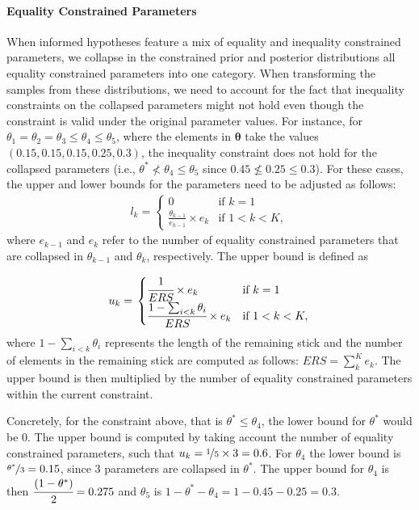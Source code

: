 \documentclass[
  english,
  man,floatsintext]{apa6}
\let\oldparagraph\paragraph
\renewcommand{\paragraph}[1]{\oldparagraph{#1}\mbox{}}
\begin{document}
\hypertarget{equality-constrained-parameters}{%
\paragraph{Equality Constrained Parameters}\label{equality-constrained-parameters}}

When informed hypotheses feature a mix of equality and inequality constrained parameters, we collapse in the constrained prior and posterior distributions all equality constrained parameters into one category. When transforming the samples from these distributions, we need to account for the fact that inequality constraints on the collapsed parameters might not hold even though the constraint is valid under the original parameter values. For instance, for \(\theta_1 = \theta_2 = \theta_3 \leq \theta_4 \leq \theta_5\), where the elements in \(\boldsymbol{\theta}\) take the values \((0.15, 0.15, 0.15, 0.25, 0.3)\), the inequality constraint does not hold for the collapsed parameters (i.e., \(\theta^* \nless \theta_4 \leq \theta_5\) since \(0.45 \nleq 0.25 \leq 0.3\)). For these cases, the upper and lower bounds for the parameters need to be adjusted as follows:
\begin{align}
  l_k = \left.
  \begin{cases}
      0 & \text{if } k = 1 \\
      \frac{\theta_{k - 1}}{e_{k-1}} \times e_k & \text{if } 1 < k < K,
  \end{cases}
    \right.
\end{align}
where \(e_{k-1}\) and \(e_k\) refer to the number of equality constrained parameters that are collapsed in \(\theta_{k - 1}\) and \(\theta_{k}\), respectively. The upper bound is defined as

\begin{align}
  u_k = \left.
  \begin{cases}
      \cfrac{1}{ERS} \times e_k & \text{if } k = 1 \\
      \cfrac{1 - \sum_{i < k} \theta_i}{ERS} \times e_k & \text{if } 1 < k < K,
  \end{cases}
    \right.
\end{align}
where \(1 - \sum_{i < k} \theta_i\) represents the length of the remaining stick and the number of elements in the remaining stick are computed as follows: \(ERS = \sum_k^{K} e_k\). The upper bound is then multiplied by the number of equality constrained parameters within the current constraint.

Concretely, for the constraint above, that is \(\theta^* \leq \theta_4\), the lower bound for \(\theta^*\) would be \(0\). The upper bound is computed by taking account the number of equality constrained parameters, such that \(u_k = \nicefrac{1}{5} \times 3 = 0.6\). For \(\theta_4\) the lower bound is \(\nicefrac{\theta^*}{3} = 0.15\), since \(3\) parameters are collapsed in \(\theta^*\). The upper bound for \(\theta_4\) is then \(\cfrac{(1 - \theta^*)}{2} = 0.275\) and \(\theta_5\) is \(1 - \theta^* - \theta_4 = 1 - 0.45 - 0.25 = 0.3\).
\end{document}

